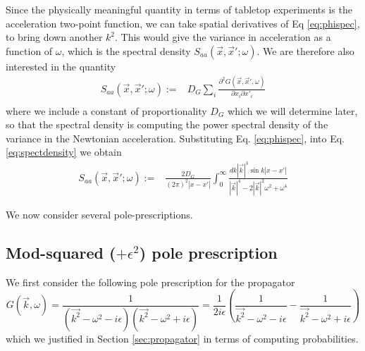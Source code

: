 \documentclass[aps,preprintnumbers,superscriptaddress,longbibliography]{revtex4-1}
\newcommand{\TRM}[1]{{\color{red}\bf #1}}
\begin{document}
Since the physically meaningful quantity in terms of tabletop experiments is the acceleration two-point function, we can take spatial derivatives of Eq \eqref{eq:phispec}, to bring down another $k^2$. This would give
the variance in acceleration as a function of $\omega$, which is the spectral density $S_{aa}(\vec{x},\vec{x}';\omega)$. We are therefore also interested in the quantity
\begin{align}
  S_{aa}(\vec{x},\vec{x}';\omega):=&D_G\sum_i \frac{\partial^2 G(\vec{x},\vec{x}',\omega)}{\partial x_i\partial x'_i}\nonumber\\
 \label{eq:spectdensity}
\end{align}
where we include a constant of proportionality $D_G$ which we will determine later, so that the spectral density is computing the power spectral density of the variance in the Newtonian acceleration. Substituting Eq. \eqref{eq:phispec}, into Eq. \eqref{eq:spectdensity} we obtain
\begin{align}
  S_{aa}(\vec{x},\vec{x}';\omega):=&\frac{2D_G}{ (2\pi)^2 |x-x'|}\int_0^\infty\frac{dk |\vec{k}|^3\sin{k|x-x'|}}{|\vec{k}|^4-2|\vec{k}|^2\omega^2+\omega^4}
  \label{eq:spectralAtx}
\end{align}


We now consider several pole-prescriptions.

\subsection{Mod-squared ($+\epsilon^2$) pole prescription}
\label{ss:mod}
We first consider the following pole prescription for the propagator
\begin{equation}
    \label{eq: plus_minus_prescription}
    G(\vec{k},\omega)=\frac{1}{(\vec{k^2}-\omega^2-i\epsilon)(\vec{k^2}-\omega^2+i\epsilon)}=\frac{1}{2i\epsilon}(\frac{1}{\vec{k^2}-\omega^2-i\epsilon}-\frac{1}{\vec{k^2}-\omega^2+i\epsilon})
\end{equation}
which we justified in Section \ref{sec:propagator} in terms of computing probabilities. %
\end{document}
